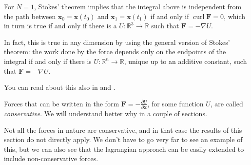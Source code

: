 \documentclass[english,fontsize=11pt,paper=a5,oneside]{scrbook}
\newcommand{\R}{\mathbb{R}}
\newcommand{\bx}{\bm{x}}
\DeclareMathOperator{\curl}{curl}
\theoremstyle{definition}
\newenvironment{remark}
  {\pushQED{\qed}\renewcommand{\qedsymbol}{$\lozenge$}\remarkx}
  {\popQED\endremarkx}
\begin{document}
\begin{remark}
For $N=1$, Stokes' theorem implies that the integral above is independent from the path between $\bx_0 = \bx(t_0)$ and $\bx_1 = \bx(t_1)$ if and only if $\curl \bm{F} = 0$, which in turn is true if and only if there is a $U:\R^3\to\R$ such that $\bm{F} = -\nabla U$.

In fact, this is true in any dimension by using the general version of Stokes' theorem: the work done by the force depends only on the endpoints of the integral if and only if there is $U:\R^n\to\R$, unique up to an additive constant, such that $\bm{F} = -\nabla U$.

You can read about this also in \cite[Chapter 2.5]{book:arnold} and \cite[Theorem 6.3 and 8.1]{book:knauf}.
\end{remark}

Forces that can be written in the form $\bm{F} = -\frac{\partial U}{\partial \bm{x}}$, for some function $U$, are called \emph{conservative}.
We will understand better why in a couple of sections.

Not all the forces in nature are conservative, and in that case the results of this section do not directly apply.
We don't have to go very far to see an example of this, but we can also see that the lagrangian approach can be easily extended to include non-conservative forces.
\end{document}
